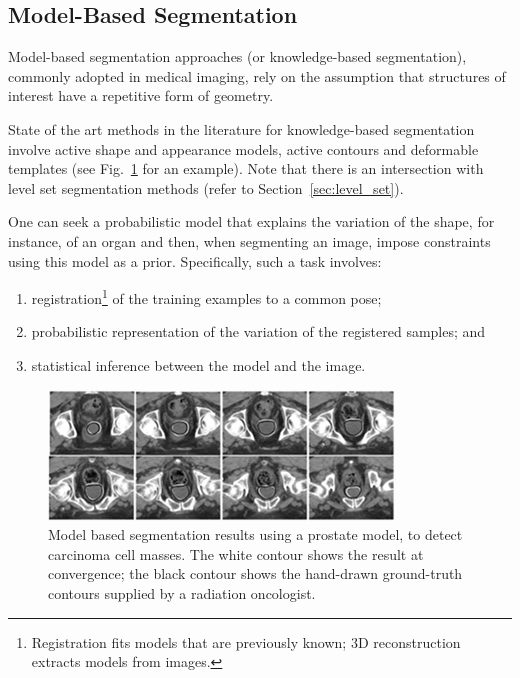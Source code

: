 \subsection{Model-Based Segmentation}

Model-based segmentation approaches (or knowledge-based segmentation), commonly adopted in medical imaging, rely on the assumption that structures of interest have a repetitive form of geometry.

State of the art methods in the literature for knowledge-based segmentation~\cite{freedman:2005} involve active shape and appearance models, active contours and deformable templates (see Fig.~\ref{img:model_based_prostate} for an example). Note that there is an intersection with level set segmentation methods (refer to Section~\ref{sec:level_set}).

One can seek a probabilistic model that explains the variation of the shape, for instance, of an organ and then, when segmenting an image, impose constraints using this model as a prior. Specifically, such a task involves:
\begin{enumerate}
\item registration\footnote{Registration fits models that are previously known; 3D reconstruction extracts models from images.} of the training examples to a common pose;

\item probabilistic representation of the variation of the registered samples; and

\item statistical inference between the model and the image.
\end{enumerate}

\begin{figure}
\centering
\includegraphics{figures/model_based_prostate}
\caption[Model based segmentation]{Model based segmentation results using a prostate model, to detect carcinoma cell masses. The white contour shows the result at convergence; the black contour shows the hand-drawn ground-truth contours supplied by a radiation oncologist.%
}
\label{img:model_based_prostate}
\end{figure}

